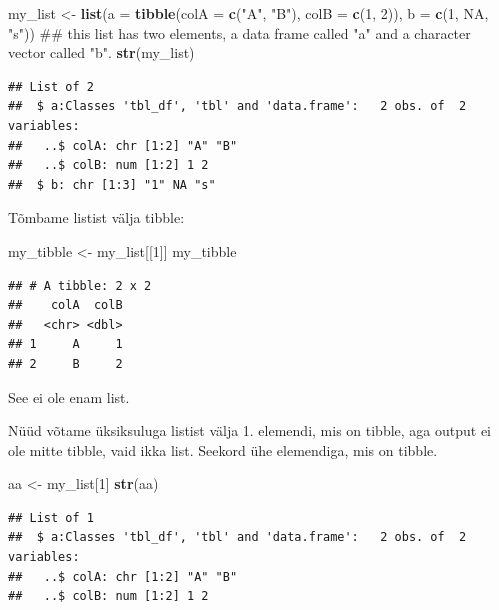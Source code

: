 \documentclass[]{book}
\newenvironment{Shaded}{\begin{snugshade}}{\end{snugshade}}
\newcommand{\KeywordTok}[1]{\textcolor[rgb]{0.13,0.29,0.53}{\textbf{#1}}}
\newcommand{\DataTypeTok}[1]{\textcolor[rgb]{0.13,0.29,0.53}{#1}}
\newcommand{\DecValTok}[1]{\textcolor[rgb]{0.00,0.00,0.81}{#1}}
\newcommand{\StringTok}[1]{\textcolor[rgb]{0.31,0.60,0.02}{#1}}
\newcommand{\OtherTok}[1]{\textcolor[rgb]{0.56,0.35,0.01}{#1}}
\newcommand{\NormalTok}[1]{#1}
\begin{document}
\begin{Shaded}
\begin{Highlighting}[]
\NormalTok{my_list <-}\StringTok{ }\KeywordTok{list}\NormalTok{(}\DataTypeTok{a =} \KeywordTok{tibble}\NormalTok{(}\DataTypeTok{colA =} \KeywordTok{c}\NormalTok{(}\StringTok{"A"}\NormalTok{, }\StringTok{"B"}\NormalTok{), }\DataTypeTok{colB =} \KeywordTok{c}\NormalTok{(}\DecValTok{1}\NormalTok{, }\DecValTok{2}\NormalTok{)), }\DataTypeTok{b =} \KeywordTok{c}\NormalTok{(}\DecValTok{1}\NormalTok{, }\OtherTok{NA}\NormalTok{, }\StringTok{"s"}\NormalTok{))}
\NormalTok{## this list has two elements, a data frame called "a" and a character vector called "b".}
\KeywordTok{str}\NormalTok{(my_list)}
\end{Highlighting}
\end{Shaded}

\begin{verbatim}
## List of 2
##  $ a:Classes 'tbl_df', 'tbl' and 'data.frame':   2 obs. of  2 variables:
##   ..$ colA: chr [1:2] "A" "B"
##   ..$ colB: num [1:2] 1 2
##  $ b: chr [1:3] "1" NA "s"
\end{verbatim}

Tõmbame listist välja tibble:

\begin{Shaded}
\begin{Highlighting}[]
\NormalTok{my_tibble <-}\StringTok{ }\NormalTok{my_list[[}\DecValTok{1}\NormalTok{]]}
\NormalTok{my_tibble}
\end{Highlighting}
\end{Shaded}

\begin{verbatim}
## # A tibble: 2 x 2
##    colA  colB
##   <chr> <dbl>
## 1     A     1
## 2     B     2
\end{verbatim}

See ei ole enam list.

Nüüd võtame üksiksuluga listist välja 1. elemendi, mis on tibble, aga
output ei ole mitte tibble, vaid ikka list. Seekord ühe elemendiga, mis
on tibble.

\begin{Shaded}
\begin{Highlighting}[]
\NormalTok{aa <-}\StringTok{ }\NormalTok{my_list[}\DecValTok{1}\NormalTok{]}
\KeywordTok{str}\NormalTok{(aa)}
\end{Highlighting}
\end{Shaded}

\begin{verbatim}
## List of 1
##  $ a:Classes 'tbl_df', 'tbl' and 'data.frame':   2 obs. of  2 variables:
##   ..$ colA: chr [1:2] "A" "B"
##   ..$ colB: num [1:2] 1 2
\end{verbatim}
\end{document}
